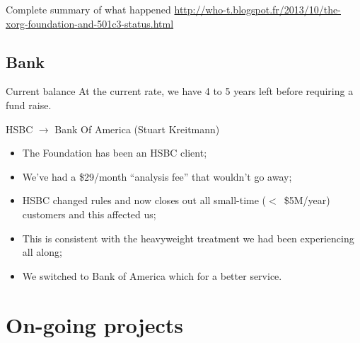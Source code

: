 \documentclass{beamer}
\begin{document}
		\begin{frame}
			\begin{block}{Complete summary of what happened}
				\url{http://who-t.blogspot.fr/2013/10/the-xorg-foundation-and-501c3-status.html}
			\end{block}
		\end{frame}

		\subsection{Bank}
		\begin{frame}
			\begin{block}{Current balance}
				At the current rate, we have 4 to 5 years left before requiring a fund raise.
			\end{block}

			\begin{block}{HSBC $\rightarrow$ Bank Of America (Stuart Kreitmann)}
				\begin{itemize}
					\item The Foundation has been an HSBC client;
					\item We've had a \$29/month ``analysis fee'' that wouldn't go away;
					\item HSBC changed rules and now closes out all small-time ($<$~\$5M/year)
customers and this affected us;
					\item This is consistent with the heavyweight treatment we had been experiencing all along;
					\item We switched to Bank of America which for a better service.
				\end{itemize}
			\end{block}
		\end{frame}

	\section{On-going projects}
\end{document}
